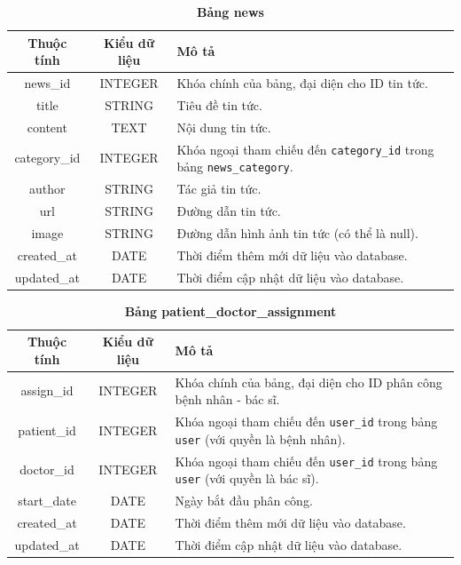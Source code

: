 \begin{table}[H]
  \caption{\bfseries \fontsize{12pt}{0pt}\selectfont Bảng news}
  \centering
  \begin{tabularx}{0.9\textwidth}{|c|c|X|}
    \hline
    \textbf{Thuộc tính} & \textbf{Kiểu dữ liệu} & \textbf{Mô tả} \\
    \hline
    news\_id & INTEGER & Khóa chính của bảng, đại diện cho ID tin tức. \\
    \hline
    title & STRING & Tiêu đề tin tức. \\
    \hline
    content & TEXT & Nội dung tin tức. \\
    \hline
    category\_id & INTEGER & Khóa ngoại tham chiếu đến \texttt{category\_id} trong bảng \texttt{news\_category}. \\
    \hline
    author & STRING & Tác giả tin tức. \\
    \hline
    url & STRING & Đường dẫn tin tức. \\
    \hline
    image & STRING & Đường dẫn hình ảnh tin tức (có thể là null). \\
    \hline
    created\_at & DATE & Thời điểm thêm mới dữ liệu vào database. \\
    \hline
    updated\_at & DATE & Thời điểm cập nhật dữ liệu vào database. \\
    \hline
  \end{tabularx}
\end{table}

\begin{table}[H]
  \caption{\bfseries \fontsize{12pt}{0pt}\selectfont Bảng patient\_doctor\_assignment}
  \centering
  \begin{tabularx}{0.9\textwidth}{|c|c|X|}
    \hline
    \textbf{Thuộc tính} & \textbf{Kiểu dữ liệu} & \textbf{Mô tả} \\
    \hline
    assign\_id & INTEGER & Khóa chính của bảng, đại diện cho ID phân công bệnh nhân - bác sĩ. \\
    \hline
    patient\_id & INTEGER & Khóa ngoại tham chiếu đến \texttt{user\_id} trong bảng \texttt{user} (với quyền là bệnh nhân). \\
    \hline
    doctor\_id & INTEGER & Khóa ngoại tham chiếu đến \texttt{user\_id} trong bảng \texttt{user} (với quyền là bác sĩ). \\
    \hline
    start\_date & DATE & Ngày bắt đầu phân công. \\
    \hline
    created\_at & DATE & Thời điểm thêm mới dữ liệu vào database. \\
    \hline
    updated\_at & DATE & Thời điểm cập nhật dữ liệu vào database. \\
    \hline
  \end{tabularx}
\end{table}


